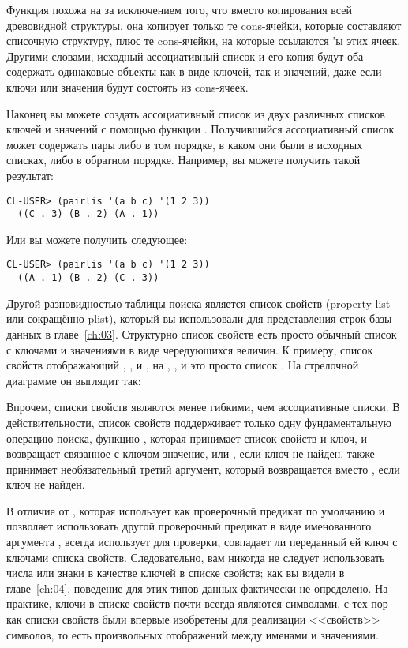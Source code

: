 Функция  похожа на  за исключением того, что вместо
копирования всей древовидной структуры, она копирует только те cons-ячейки, которые
составляют списочную структуру, плюс те cons-ячейки, на которые ссылаются 'ы
этих ячеек. Другими словами, исходный ассоциативный список и его копия будут оба содержать
одинаковые объекты как в виде ключей, так и значений, даже если ключи или значения будут
состоять из cons-ячеек.

Наконец вы можете создать ассоциативный список из двух различных списков ключей и значений
с помощью функции . Получившийся ассоциативный список может содержать пары
либо в том порядке, в каком они были в исходных списках, либо в обратном
порядке. Например, вы можете получить такой результат:

\begin{lstlisting}[style=lisprepl]
  CL-USER> (pairlis '(a b c) '(1 2 3))
  ((C . 3) (B . 2) (A . 1))
\end{lstlisting}

Или вы можете получить следующее:

\begin{lstlisting}[style=lisprepl]
  CL-USER> (pairlis '(a b c) '(1 2 3))
  ((A . 1) (B . 2) (C . 3))
\end{lstlisting}

Другой разновидностью таблицы поиска является список свойств (property list или сокращённо
plist), который вы использовали для представления строк базы данных в главе~\ref{ch:03}.
Структурно список свойств есть просто обычный список с ключами и значениями в виде
чередующихся величин. К примеру, список свойств отображающий , , и
, на , , и  это просто список . На
стрелочной диаграмме он выглядит так:


Впрочем, списки свойств являются менее гибкими, чем ассоциативные списки. В
действительности, список свойств поддерживает только одну фундаментальную операцию поиска,
функцию , которая принимает список свойств и ключ, и возвращает связанное с
ключом значение, или , если ключ не найден.  также принимает
необязательный третий аргумент, который возвращается вместо , если ключ не
найден.

В отличие от , которая использует  как проверочный предикат по
умолчанию и позволяет использовать другой проверочный предикат в виде именованного
аргумента ,  всегда использует  для проверки, совпадает ли
переданный ей ключ с ключами списка свойств. Следовательно, вам никогда не следует
использовать числа или знаки в качестве ключей в списке свойств; как вы видели в
главе~\ref{ch:04}, поведение  для этих типов данных фактически не определено. На
практике, ключи в списке свойств почти всегда являются символами, с тех пор как списки
свойств были впервые изобретены для реализации <<свойств>> символов, то есть произвольных
отображений между именами и значениями.

